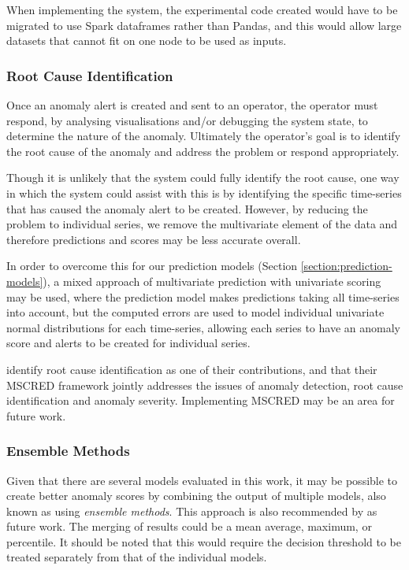 \documentclass{mpaper}
\begin{document}
When implementing the system, the experimental code created would have to be migrated to use Spark dataframes rather than Pandas, and this would allow large datasets that cannot fit on one node to be used as inputs.

\subsubsection{Root Cause Identification}

Once an anomaly alert is created and sent to an operator, the operator must respond, by analysing visualisations and/or debugging the system state, to determine the nature of the anomaly. Ultimately the operator's goal is to identify the root cause of the anomaly and address the problem or respond appropriately. 

Though it is unlikely that the system could fully identify the root cause, one way in which the system could assist with this is by identifying the specific time-series that has caused the anomaly alert to be created. However, by reducing the problem to individual series, we remove the multivariate element of the data and therefore predictions and scores may be less accurate overall.

In order to overcome this for our prediction models (Section \ref{section:prediction-models}), a mixed approach of multivariate prediction with univariate scoring may be used, where the prediction model makes predictions taking all time-series into account, but the computed errors are used to model individual univariate normal distributions for each time-series, allowing each series to have an anomaly score and alerts to be created for individual series.

\cite{deepMultivariateNetwork} identify root cause identification as one of their contributions, and that their MSCRED framework jointly addresses the issues of anomaly detection, root cause identification and anomaly severity. Implementing MSCRED may be an area for future work.

\subsubsection{Ensemble Methods}

Given that there are several models evaluated in this work, it may be possible to create better anomaly scores by combining the output of multiple models, also known as using \textit{ensemble methods}. This approach is also recommended by \cite{MicrosoftTimeSeries} as future work. The merging of results could be a mean average, maximum, or percentile. It should be noted that this would require the decision threshold to be treated separately from that of the individual models.
\end{document}
